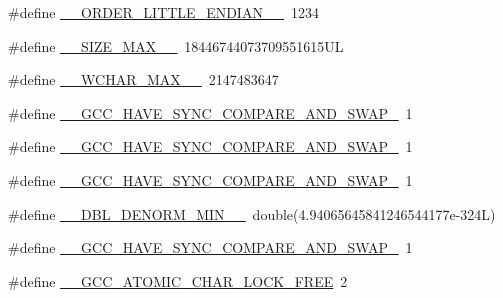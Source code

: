 \begin{DoxyCompactItemize}
\#define \hyperlink{build-analizer__host-_desktop___qt__5__9__0___g_c_c__64bit-_release_2moc__predefs_8h_a2b695357ce4b46971d54e8e9dfe5724f}{\+\_\+\+\_\+\+O\+R\+D\+E\+R\+\_\+\+L\+I\+T\+T\+L\+E\+\_\+\+E\+N\+D\+I\+A\+N\+\_\+\+\_\+}~1234
\item 
\#define \hyperlink{build-analizer__host-_desktop___qt__5__9__0___g_c_c__64bit-_release_2moc__predefs_8h_a66fbb70a69c9f66830f95a20e46091a6}{\+\_\+\+\_\+\+S\+I\+Z\+E\+\_\+\+M\+A\+X\+\_\+\+\_\+}~18446744073709551615\+U\+L
\item 
\#define \hyperlink{build-analizer__host-_desktop___qt__5__9__0___g_c_c__64bit-_release_2moc__predefs_8h_a65ac8cd0434319a3a31dc031409c218a}{\+\_\+\+\_\+\+W\+C\+H\+A\+R\+\_\+\+M\+A\+X\+\_\+\+\_\+}~2147483647
\item 
\#define \hyperlink{build-analizer__host-_desktop___qt__5__9__0___g_c_c__64bit-_release_2moc__predefs_8h_a33433eca9e18e14156165252746f4d44}{\+\_\+\+\_\+\+G\+C\+C\+\_\+\+H\+A\+V\+E\+\_\+\+S\+Y\+N\+C\+\_\+\+C\+O\+M\+P\+A\+R\+E\+\_\+\+A\+N\+D\+\_\+\+S\+W\+A\+P\+\_}~1
\item 
\#define \hyperlink{build-analizer__host-_desktop___qt__5__9__0___g_c_c__64bit-_release_2moc__predefs_8h_a7237ce09defceeebe3ba0afc528275ac}{\+\_\+\+\_\+\+G\+C\+C\+\_\+\+H\+A\+V\+E\+\_\+\+S\+Y\+N\+C\+\_\+\+C\+O\+M\+P\+A\+R\+E\+\_\+\+A\+N\+D\+\_\+\+S\+W\+A\+P\+\_}~1
\item 
\#define \hyperlink{build-analizer__host-_desktop___qt__5__9__0___g_c_c__64bit-_release_2moc__predefs_8h_a6310789290c9c5717826b56443ce69ec}{\+\_\+\+\_\+\+G\+C\+C\+\_\+\+H\+A\+V\+E\+\_\+\+S\+Y\+N\+C\+\_\+\+C\+O\+M\+P\+A\+R\+E\+\_\+\+A\+N\+D\+\_\+\+S\+W\+A\+P\+\_}~1
\item 
\#define \hyperlink{build-analizer__host-_desktop___qt__5__9__0___g_c_c__64bit-_release_2moc__predefs_8h_aca2a716d3e84ccffe000390bb2e2fb38}{\+\_\+\+\_\+\+D\+B\+L\+\_\+\+D\+E\+N\+O\+R\+M\+\_\+\+M\+I\+N\+\_\+\+\_\+}~double(4.\+94065645841246544177e-\/324\+L)
\item 
\#define \hyperlink{build-analizer__host-_desktop___qt__5__9__0___g_c_c__64bit-_release_2moc__predefs_8h_a86bb5059d696b19082c1aff4ae93a87a}{\+\_\+\+\_\+\+G\+C\+C\+\_\+\+H\+A\+V\+E\+\_\+\+S\+Y\+N\+C\+\_\+\+C\+O\+M\+P\+A\+R\+E\+\_\+\+A\+N\+D\+\_\+\+S\+W\+A\+P\+\_}~1
\item 
\#define \hyperlink{build-analizer__host-_desktop___qt__5__9__0___g_c_c__64bit-_release_2moc__predefs_8h_a403ff8d656461ff5a083fb47f73c7da3}{\+\_\+\+\_\+\+G\+C\+C\+\_\+\+A\+T\+O\+M\+I\+C\+\_\+\+C\+H\+A\+R\+\_\+\+L\+O\+C\+K\+\_\+\+F\+R\+E\+E}~2

\end{DoxyCompactItemize}
